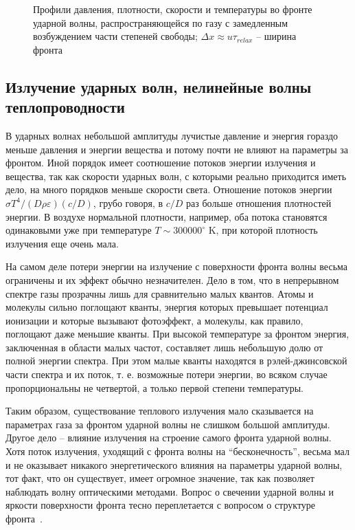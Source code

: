 \documentclass[10pt, a4paper]{article}
\begin{document}
\begin{figure}[ht]
\begin{center}
\begin{minipage}[ht]{0.32\linewidth}
			\caption{Профили давления, плотности, скорости и температуры во фронте ударной волны, распространяющейся по газу с замедленным возбуждением части степеней свободы; $\Delta x\approx u\tau_{relax}$ -- ширина фронта~\cite{zeldovich}}
			\label{fig:shock_wave_profiles} 
		\end{minipage}
	\end{center}
\end{figure}

\subsection{Излучение ударных волн, нелинейные волны теплопроводности}

В ударных волнах небольшой амплитуды лучистые давление и энергия гораздо меньше давления и энергии вещества и потому почти не влияют на параметры за фронтом. Иной порядок имеет соотношение потоков энергии излучения и вещества, так как скорости ударных волн, с которыми реально приходится иметь дело, на много порядков меньше скорости света. Отношение потоков энергии $\sigma T^4/(D\rho\varepsilon)(c/D)$, грубо говоря, в $c/D$ раз больше отношения плотностей энергии. В воздухе нормальной плотности, например, оба потока становятся одинаковыми уже при температуре $T\sim300000^\circ$ K, при которой плотность излучения еще очень мала.

На самом деле потери энергии на излучение с поверхности фронта волны весьма ограничены и их эффект обычно незначителен. Дело в том, что в непрерывном спектре газы прозрачны лишь для сравнительно малых квантов. Атомы и молекулы сильно поглощают кванты, энергия которых превышает потенциал ионизации и которые вызывают фотоэффект, а молекулы, как правило, поглощают даже меньшие кванты. При высокой температуре за фронтом энергия, заключенная в области малых частот, составляет лишь небольшую долю от полной энергии спектра. При этом малые кванты находятся в рэлей-джинсовской части спектра и их поток, т. е. возможные потери энергии, во всяком случае пропорциональны не четвертой, а только первой степени температуры.

Таким образом, существование теплового излучения мало сказывается на параметрах газа за фронтом ударной волны не слишком большой амплитуды. Другое дело -- влияние излучения на строение самого фронта ударной волны. Хотя поток излучения, уходящий с фронта волны на ``бесконечность'', весьма мал и не оказывает никакого энергетического влияния на параметры ударной волны, тот факт, что он существует, имеет огромное значение, так как позволяет наблюдать волну оптическими методами. Вопрос о свечении ударной волны и яркости поверхности фронта тесно переплетается с вопросом о структуре фронта~\cite{zeldovich}.
\end{document}

